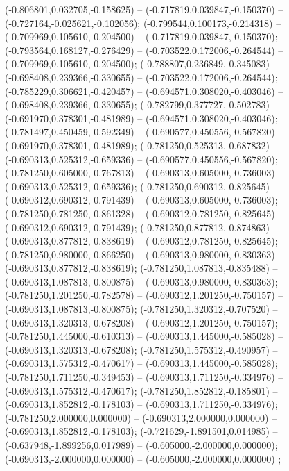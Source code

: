  (-0.806801,0.032705,-0.158625) -- (-0.717819,0.039847,-0.150370) -- (-0.727164,-0.025621,-0.102056);
 (-0.799544,0.100173,-0.214318) -- (-0.709969,0.105610,-0.204500) -- (-0.717819,0.039847,-0.150370);
 (-0.793564,0.168127,-0.276429) -- (-0.703522,0.172006,-0.264544) -- (-0.709969,0.105610,-0.204500);
 (-0.788807,0.236849,-0.345083) -- (-0.698408,0.239366,-0.330655) -- (-0.703522,0.172006,-0.264544);
 (-0.785229,0.306621,-0.420457) -- (-0.694571,0.308020,-0.403046) -- (-0.698408,0.239366,-0.330655);
 (-0.782799,0.377727,-0.502783) -- (-0.691970,0.378301,-0.481989) -- (-0.694571,0.308020,-0.403046);
 (-0.781497,0.450459,-0.592349) -- (-0.690577,0.450556,-0.567820) -- (-0.691970,0.378301,-0.481989);
 (-0.781250,0.525313,-0.687832) -- (-0.690313,0.525312,-0.659336) -- (-0.690577,0.450556,-0.567820);
 (-0.781250,0.605000,-0.767813) -- (-0.690313,0.605000,-0.736003) -- (-0.690313,0.525312,-0.659336);
 (-0.781250,0.690312,-0.825645) -- (-0.690312,0.690312,-0.791439) -- (-0.690313,0.605000,-0.736003);
 (-0.781250,0.781250,-0.861328) -- (-0.690312,0.781250,-0.825645) -- (-0.690312,0.690312,-0.791439);
 (-0.781250,0.877812,-0.874863) -- (-0.690313,0.877812,-0.838619) -- (-0.690312,0.781250,-0.825645);
 (-0.781250,0.980000,-0.866250) -- (-0.690313,0.980000,-0.830363) -- (-0.690313,0.877812,-0.838619);
 (-0.781250,1.087813,-0.835488) -- (-0.690313,1.087813,-0.800875) -- (-0.690313,0.980000,-0.830363);
 (-0.781250,1.201250,-0.782578) -- (-0.690312,1.201250,-0.750157) -- (-0.690313,1.087813,-0.800875);
 (-0.781250,1.320312,-0.707520) -- (-0.690313,1.320313,-0.678208) -- (-0.690312,1.201250,-0.750157);
 (-0.781250,1.445000,-0.610313) -- (-0.690313,1.445000,-0.585028) -- (-0.690313,1.320313,-0.678208);
 (-0.781250,1.575312,-0.490957) -- (-0.690313,1.575312,-0.470617) -- (-0.690313,1.445000,-0.585028);
 (-0.781250,1.711250,-0.349453) -- (-0.690313,1.711250,-0.334976) -- (-0.690313,1.575312,-0.470617);
 (-0.781250,1.852812,-0.185801) -- (-0.690313,1.852812,-0.178103) -- (-0.690313,1.711250,-0.334976);
 (-0.781250,2.000000,0.000000) -- (-0.690313,2.000000,0.000000) -- (-0.690313,1.852812,-0.178103);
 (-0.721629,-1.891501,0.014985) -- (-0.637948,-1.899256,0.017989) -- (-0.605000,-2.000000,0.000000);
 (-0.690313,-2.000000,0.000000) -- (-0.605000,-2.000000,0.000000) ;
